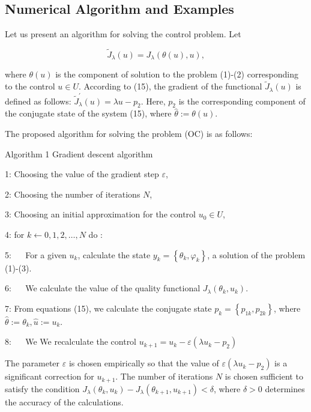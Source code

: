 \subsection{Numerical Algorithm and Examples}
Let us present an algorithm for solving the control problem. Let

$$
\widetilde{J}_{\lambda}(u)=J_{\lambda}(\theta(u), u),
$$

where $\theta(u)$ is the component of solution to the problem (1)-(2) corresponding to the control $u \in U$. According to (15), the gradient of the functional $\widetilde{J}_{\lambda}(u)$ is defined as follows: $\widetilde{J}_{\lambda}^{\prime}(u)=\lambda u-p_{2}$. Here, $p_{2}$ is the corresponding component of the conjugate state of the system (15), where $\widehat{\theta}:=\theta(u)$.

The proposed algorithm for solving the problem (OC) is as follows:

Algorithm 1 Gradient descent algorithm

1: Choosing the value of the gradient step $\varepsilon$,

2: Choosing the number of iterations $N$,

3: Choosing an initial approximation for the control $u_{0} \in U$,

4: for $k \leftarrow 0,1,2, \ldots, N$ do :

5: $\quad$ For a given $u_{k}$, calculate the state $y_{k}=\left\{\theta_{k}, \varphi_{k}\right\}$, a solution of the problem (1)-(3).

6: $\quad$ We calculate the value of the quality functional $J_{\lambda}\left(\theta_{k}, u_{k}\right)$.

7: From equations (15), we calculate the conjugate state $p_{k}=\left\{p_{1 k}, p_{2 k}\right\}$, where $\widehat{\theta}:=\theta_{k}, \widehat{u}:=u_{k}$.

8: $\quad$ We We recalculate the control $u_{k+1}=u_{k}-\varepsilon\left(\lambda u_{k}-p_{2}\right)$

The parameter $\varepsilon$ is chosen empirically so that the value of $\varepsilon\left(\lambda u_{k}-p_{2}\right)$ is a significant correction for $u_{k+1}$. The number of iterations $N$ is chosen sufficient to satisfy the condition $J_{\lambda}\left(\theta_{k}, u_{k}\right)-J_{\lambda}\left(\theta_{k+1}, u_{k+1}\right)<\delta$, where $\delta>0$ determines the accuracy of the calculations.

